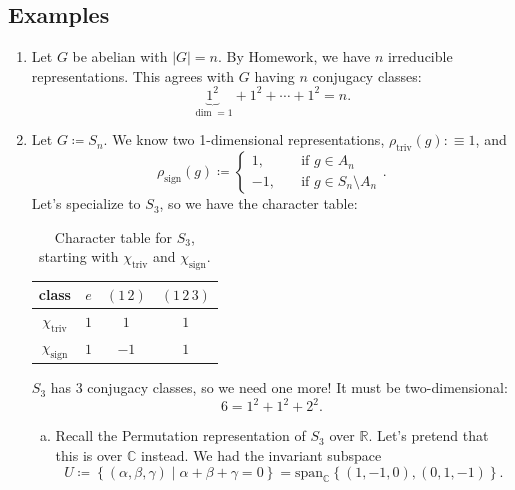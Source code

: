 \documentclass[12pt]{article}
\newcommand{\cx}{\mathbb{C}}
\newcommand{\real}{\mathbb{R}}
\newcommand\setb[1]{\left \{ #1 \right \}}
\newcommand{\spank}[1]{\mathrm{span}_{#1}}
\theoremstyle{definition}
\begin{document}
\subsection{Examples}
\begin{enumerate}[start=0]
    \item Let $G$ be abelian with $|G| = n$. By Homework, we have $n$ irreducible representations. This agrees with $G$ having $n$ conjugacy classes:
    \begin{equation}
        \underbrace{1^2}_{\dim = 1} + 1^2 + \dotsb + 1^2 = n.
    \end{equation}
    \item Let $G \coloneqq  S_n$. We know two 1-dimensional representations, $\rho_{\text{triv}}(g) : \equiv 1$, and 
    \begin{equation}
        \rho_{\text{sign}}(g) \coloneqq  
        \begin{cases}
            1 , & \quad \text{if } g \in A_n \\
            -1 , & \quad \text{if } g \in S_n \setminus A_n
        \end{cases}.
    \end{equation}
    Let's specialize to $S_3$, so we have the character table:
    \begin{table}[H]
        \centering
        \begin{tabular}{|| c || c | c | c ||}
            \hline
            class & $e$ & $(1\,2)$ & $(1\,2\,3)$ \\
            \hline
            $\chi_{\text{triv}}$ & $1$ & $1$ & $1$ \\
            $\chi_{\text{sign}}$ & $1$ & $-1$ & $1$ \\
            \hline
        \end{tabular}
        \caption{Character table for $S_3$, starting with $\chi_{\text{triv}}$ and $\chi_{\text{sign}}$.}
        \label{tab:Table2}
    \end{table}
    $S_3$ has 3 conjugacy classes, so we need one more! It must be two-dimensional:
    \begin{equation}
        6 = 1^2 + 1^2 + 2^2.
    \end{equation}
    \begin{enumerate}[(a)]
        \item Recall the Permutation representation of $S_3$ over $\real$. Let's pretend that this is over $\cx$ instead. We had the invariant subspace 
        \begin{equation}
            U \coloneqq  \setb{ (\alpha , \beta , \gamma) \mid \alpha + \beta + \gamma = 0} = \spank{\cx} \setb{(1,-1,0) , (0,1,-1)}.

\end{equation}
\end{enumerate}
\end{enumerate}
\end{document}

